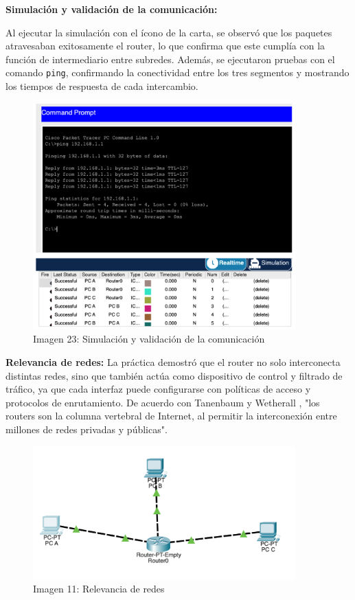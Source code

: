 \documentclass[letterpaper,12pt,oneside]{article}
\begin{document}
\textbf{Simulación y validación de la comunicación:}

Al ejecutar la simulación con el ícono de la carta, se observó que los paquetes atravesaban exitosamente el router, lo que confirma que este cumplía con la función de intermediario entre subredes. Además, se ejecutaron pruebas con el comando \texttt{ping}, confirmando la conectividad entre los tres segmentos y mostrando los tiempos de respuesta de cada intercambio.

\begin{figure}[H]
\centering
\includegraphics[width=0.9\textwidth]{23.png}
\caption{Imagen 23: Simulación y validación de la comunicación}
\end{figure}

\textbf{Relevancia de redes:}
La práctica demostró que el router no solo interconecta distintas redes, sino que también actúa como dispositivo de control y filtrado de tráfico, ya que cada interfaz puede configurarse con políticas de acceso y protocolos de enrutamiento. De acuerdo con Tanenbaum y Wetherall , "los routers son la columna vertebral de Internet, al permitir la interconexión entre millones de redes privadas y públicas".
\begin{figure}[H]
\centering
\includegraphics[width=0.9\textwidth]{11.png}
\caption{Imagen 11: Relevancia de redes}
\end{figure}
\end{document}
